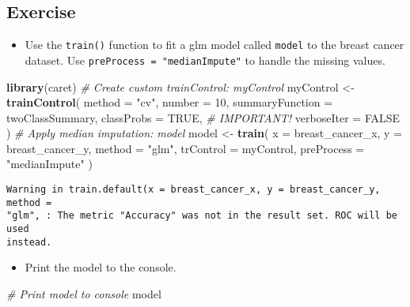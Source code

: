 \documentclass[]{book}
\newenvironment{Shaded}{\begin{snugshade}}{\end{snugshade}}
\newcommand{\KeywordTok}[1]{\textcolor[rgb]{0.13,0.29,0.53}{\textbf{#1}}}
\newcommand{\DataTypeTok}[1]{\textcolor[rgb]{0.13,0.29,0.53}{#1}}
\newcommand{\DecValTok}[1]{\textcolor[rgb]{0.00,0.00,0.81}{#1}}
\newcommand{\StringTok}[1]{\textcolor[rgb]{0.31,0.60,0.02}{#1}}
\newcommand{\CommentTok}[1]{\textcolor[rgb]{0.56,0.35,0.01}{\textit{#1}}}
\newcommand{\OtherTok}[1]{\textcolor[rgb]{0.56,0.35,0.01}{#1}}
\newcommand{\NormalTok}[1]{#1}
\providecommand{\tightlist}{%
  \setlength{\itemsep}{0pt}\setlength{\parskip}{0pt}}
\begin{document}
\subsection*{Exercise}\label{exercise-23}

\begin{itemize}
\tightlist
\item
  Use the \texttt{train()} function to fit a glm model called
  \texttt{model} to the breast cancer dataset. Use
  \texttt{preProcess\ =\ "medianImpute"} to handle the missing values.
\end{itemize}

\begin{Shaded}
\begin{Highlighting}[]
\KeywordTok{library}\NormalTok{(caret)}
\CommentTok{# Create custom trainControl: myControl}
\NormalTok{myControl <-}\StringTok{ }\KeywordTok{trainControl}\NormalTok{(}
  \DataTypeTok{method =} \StringTok{"cv"}\NormalTok{, }
  \DataTypeTok{number =} \DecValTok{10}\NormalTok{,}
  \DataTypeTok{summaryFunction =}\NormalTok{ twoClassSummary,}
  \DataTypeTok{classProbs =} \OtherTok{TRUE}\NormalTok{, }\CommentTok{# IMPORTANT!}
  \DataTypeTok{verboseIter =} \OtherTok{FALSE}
\NormalTok{)}
\CommentTok{# Apply median imputation: model}
\NormalTok{model <-}\StringTok{ }\KeywordTok{train}\NormalTok{(}
  \DataTypeTok{x =}\NormalTok{ breast_cancer_x, }\DataTypeTok{y =}\NormalTok{ breast_cancer_y,}
  \DataTypeTok{method =} \StringTok{"glm"}\NormalTok{,}
  \DataTypeTok{trControl =}\NormalTok{ myControl,}
  \DataTypeTok{preProcess =} \StringTok{"medianImpute"}
\NormalTok{)}
\end{Highlighting}
\end{Shaded}

\begin{verbatim}
Warning in train.default(x = breast_cancer_x, y = breast_cancer_y, method =
"glm", : The metric "Accuracy" was not in the result set. ROC will be used
instead.
\end{verbatim}

\begin{itemize}
\tightlist
\item
  Print the model to the console.
\end{itemize}

\begin{Shaded}
\begin{Highlighting}[]
\CommentTok{# Print model to console}
\NormalTok{model}
\end{Highlighting}
\end{Shaded}
\end{document}
